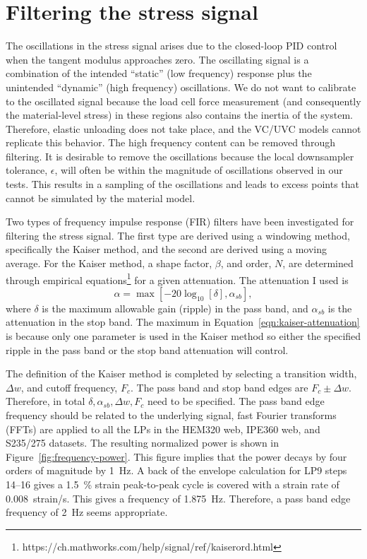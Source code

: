 \documentclass[a4paper,11pt]{article}
\begin{document}



\appendix


\section{Filtering the stress signal}

The oscillations in the stress signal arises due to the closed-loop PID control when the tangent modulus approaches zero.
The oscillating signal is a combination of the intended ``static'' (low frequency) response plus the unintended ``dynamic'' (high frequency) oscillations.
We do not want to calibrate to the oscillated signal because the load cell force measurement (and consequently the material-level stress) in these regions also contains the inertia of the system.
Therefore, elastic unloading does not take place, and the VC/UVC models cannot replicate this behavior.
The high frequency content can be removed through filtering.
It is desirable to remove the oscillations because the local downsampler tolerance, $\epsilon$, will often be within the magnitude of oscillations observed in our tests.
This results in a sampling of the oscillations and leads to excess points that cannot be simulated by the material model.

Two types of frequency impulse response (FIR) filters have been investigated for filtering the stress signal.
The first type are derived using a windowing method, specifically the Kaiser method, and the second are derived using a moving average.
For the Kaiser method, a shape factor, $\beta$, and order, $N$, are determined through empirical equations\footnote{https://ch.mathworks.com/help/signal/ref/kaiserord.html} for a given attenuation.
The attenuation I used is
\begin{equation}
    \label{eqn:kaiser-attenuation}
    \alpha = \max \left[ -20 \log_{10}[\delta] , \alpha_{sb} \right],
\end{equation}
where $\delta$ is the maximum allowable gain (ripple) in the pass band, and $\alpha_{sb}$ is the attenuation in the stop band.
The maximum in Equation~\ref{eqn:kaiser-attenuation} is because only one parameter is used in the Kaiser method so either the specified ripple in the pass band or the stop band attenuation will control.

The definition of the Kaiser method is completed by selecting a transition width, $\Delta w$, and cutoff frequency, $F_c$.
The pass band and stop band edges are $F_c \pm \Delta w$.
Therefore, in total $\delta, \alpha_{sb}, \Delta w, F_c$ need to be specified.
The pass band edge frequency should be related to the underlying signal, fast Fourier transforms (FFTs) are applied to all the LPs in the HEM320 web, IPE360 web, and S235/275 datasets.
The resulting normalized power is shown in Figure~\ref{fig:frequency-power}.
This figure implies that the power decays by four orders of magnitude by 1~Hz.
A back of the envelope calculation for LP9 steps 14--16 gives a 1.5~\% strain peak-to-peak cycle is covered with a strain rate of 0.008~strain/s.
This gives a frequency of 1.875~Hz.
Therefore, a pass band edge frequency of 2~Hz seems appropriate.
\end{document}
